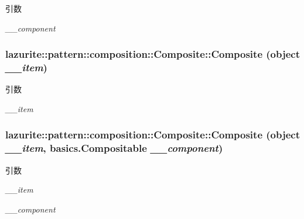 \begin{DoxyParams}{引数}
\item[{\em \_\-\_\-component}]\end{DoxyParams}
\hypertarget{classlazurite_1_1pattern_1_1composition_1_1_composite_a5f487093fb2ea35732eff5b4dd98a98a}{
\subsubsection[{Composite}]{\setlength{\rightskip}{0pt plus 5cm}lazurite::pattern::composition::Composite::Composite (object {\em \_\-\_\-item})}}
\label{classlazurite_1_1pattern_1_1composition_1_1_composite_a5f487093fb2ea35732eff5b4dd98a98a}

\begin{DoxyParams}{引数}
\item[{\em \_\-\_\-item}]\end{DoxyParams}
\hypertarget{classlazurite_1_1pattern_1_1composition_1_1_composite_affbe464e61dc6535a6b87956a73eac9e}{
\subsubsection[{Composite}]{\setlength{\rightskip}{0pt plus 5cm}lazurite::pattern::composition::Composite::Composite (object {\em \_\-\_\-item}, \/  {\bf basics.Compositable} {\em \_\-\_\-component})}}
\label{classlazurite_1_1pattern_1_1composition_1_1_composite_affbe464e61dc6535a6b87956a73eac9e}

\begin{DoxyParams}{引数}
\item[{\em \_\-\_\-item}]\item[{\em \_\-\_\-component}]\end{DoxyParams}


